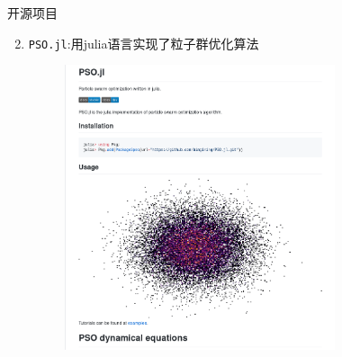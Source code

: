 \documentclass[xcolor=dvipsnames]{beamer} %
\begin{document}
\begin{frame}{开源项目}
    \vspace{-2mm}
    \begin{enumerate}        
    \setcounter{enumi}{1}
        \item \texttt{PSO.jl}:用julia语言实现了粒子群优化算法
        \begin{figure}[htbp!]
            \centering
            \includegraphics[width = 0.75\textwidth]{./pic/PSO.png}
        \end{figure}
    \end{enumerate} 
\end{frame}
\end{document}
